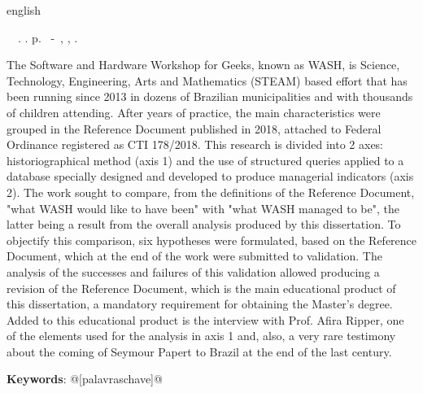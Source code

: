 \begin{resumo}[Abstract]
 \begin{otherlanguage*}{english}
	\begin{flushleft} 
		\setlength{\absparsep}{0pt} %
 		\SingleSpacing  		\imprimirautorabr~~\textbf{\imprimirtitleabstract}.	\imprimirdata.  \pageref{LastPage}p. 
		\imprimirtipotrabalhoabs~-~\imprimirinstituicao, \imprimirlocal, 	\imprimirdata. 
 	\end{flushleft}
	\OnehalfSpacing 
The Software and Hardware Workshop for Geeks, known as WASH, is Science, Technology, Engineering, Arts and Mathematics (STEAM) based effort that has been running since 2013 in dozens of Brazilian municipalities and with thousands of children attending. After years of practice, the main characteristics were grouped in the Reference Document published in 2018, attached to Federal Ordinance registered as CTI 178/2018. This research is divided into 2 axes: historiographical method (axis 1) and the use of structured queries applied to a database specially designed and developed to produce managerial indicators (axis 2). The work sought to compare, from the definitions of the Reference Document, "what WASH would like to have been" with "what WASH managed to be", the latter being a result from the overall analysis produced by this dissertation. To objectify this comparison, six hypotheses were formulated, based on the Reference Document, which at the end of the work were submitted to validation. The analysis of the successes and failures of this validation allowed producing a revision of the Reference Document, which is the main educational product of this dissertation, a mandatory requirement for obtaining the Master's degree. Added to this educational product is the interview with Prof. Afira Ripper, one of the elements used for the analysis in axis 1 and, also, a very rare testimony about the coming of Seymour Papert to Brazil at the end of the last century.


   \vspace{\onelineskip}
 
   \noindent 
   \textbf{Keywords}: @[palavraschave]@ 
 \end{otherlanguage*}
\end{resumo}
